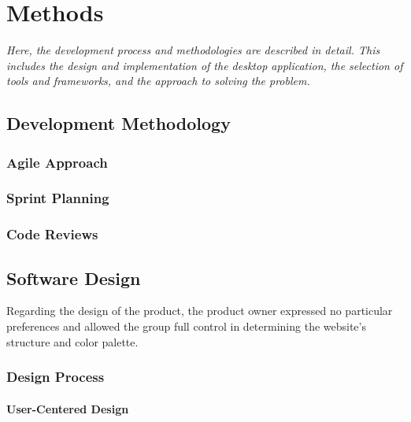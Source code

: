 \chapter{Methods}
\label{chp:methods}

\begin{center}
    \textit{Here, the development process and methodologies are described in detail. This includes the design and implementation of the desktop application, the selection of tools and frameworks, and the approach to solving the problem.}
\end{center}

\section{Development Methodology}
\label{sec:development-methodology}

\subsection{Agile Approach}
\label{subsec:agile-approach}

\subsection{Sprint Planning}
\label{subsec:sprint-planning}

\subsection{Code Reviews}
\label{subsec:code-review}

\section{Software Design}
\label{sec:software-design}

Regarding the design of the product, the product owner expressed no particular preferences and allowed the group full control in determining the website’s structure and color palette. 

\subsection{Design Process}
\label{subsec:design-process}

\subsubsection*{User-Centered Design}
\label{subsubsec:user-centered-design}

